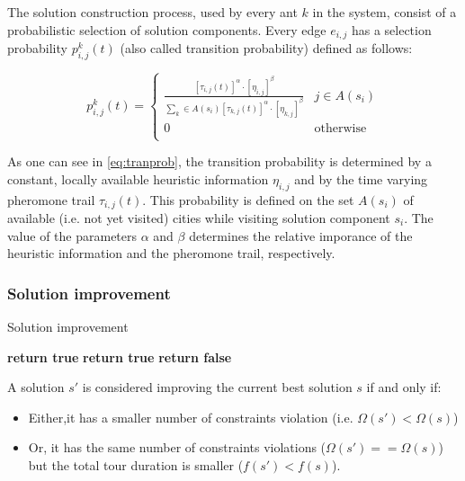 \begin{homeworkProblem}
The solution construction process, used by every ant $k$ in the system, consist of a probabilistic selection of solution components.
Every edge $e_{i,j}$ has a selection probability $p_{i,j}^k(t)$ (also called transition probability) defined as follows:

\begin{equation} \label{eq:tranprob}
p_{i,j}^k(t) = \begin{cases}
  \frac{[\tau_{i,j}(t)]^\alpha \cdot [\eta_{i,j}]^\beta}{\sum_{k} \in A(s_{i}) [\tau_{k,j}(t)]^\alpha \cdot [\eta_{k,j}]^\beta} & j \in A(s_{i}) \\
 0 & \text{otherwise} \\
\end{cases}
\end{equation}

As one can see in \ref{eq:tranprob}, the transition probability is determined by a constant, locally available heuristic information $\eta_{i,j}$ and by the time varying pheromone trail $\tau_{i,j}(t)$.
This probability is defined on the set $A(s_i)$ of available (i.e. not yet visited) cities while visiting solution component $s_i$.
The value of the parameters $\alpha$ and $\beta$ determines the relative imporance of the heuristic information and the pheromone trail, respectively.

\subsubsection{Solution improvement}
\begin{algorithm}[!h]
  \caption{Solution improvement}\label{sol}
  \begin{algorithmic}[1]
          \State \textbf{return true}
      \Else
            \State \textbf{return true}
           \EndIf
      \EndIf
      \State \textbf{return false}
      \EndProcedure
\end{algorithmic}
\end{algorithm}

A solution $s'$ is considered improving the current best solution $s$ if and only if:
\begin{itemize}
  \item Either,it has a smaller number of constraints violation (i.e. $\Omega(s') < \Omega(s)$)
  \item Or, it has the same number of constraints violations ($\Omega(s') == \Omega(s)$) but the total tour duration is smaller ($f(s') < f(s)$).
\end{itemize}



\end{homeworkProblem}
